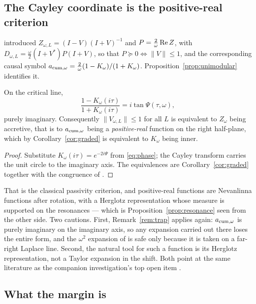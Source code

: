 \subsection{The Cayley coordinate is the positive-real criterion}

\cite{CumulativePath} introduced $Z_{\omega,L}=(I-V)(I+V)^{-1}$ and
$P=\frac2\omega\operatorname{Re} Z$, with $D_{\omega,L}=\frac\omega2(I+V^*)P(I+V)$, so that
$P\succeq0\iff\lVert V\rVert\leq1$, and the corresponding causal symbol
$a_{\rm cum,\omega}=\frac2\omega(1-K_\omega)/(1+K_\omega)$.
Proposition~\ref{prop:unimodular} identifies it.

\begin{proposition}[Reactance]\label{prop:cayley}
On the critical line,
\[
 \frac{1-K_\omega(i\tau)}{1+K_\omega(i\tau)}=i\tan\Psi(\tau,\omega),
\]
purely imaginary. Consequently $\lVert V_{\omega,L}\rVert\leq1$ for all $L$ is
equivalent to $Z_\omega$ being accretive, that is to $a_{\rm cum,\omega}$ being a
\emph{positive-real} function on the right half-plane, which by
Corollary~\ref{cor:graded} is equivalent to $K_\omega$ being inner.
\end{proposition}

\begin{proof}
Substitute $K_\omega(i\tau)=e^{-2i\Psi}$ from \eqref{eq:phase}; the Cayley
transform carries the unit circle to the imaginary axis. The equivalences are
Corollary~\ref{cor:graded} together with the congruence of
\cite{CumulativePath}.
\end{proof}

That is the classical passivity criterion, and positive-real functions are
Nevanlinna functions after rotation, with a Herglotz representation whose measure
is supported on the resonances --- which is Proposition~\ref{prop:resonance} seen
from the other side. Two cautions. First, Remark~\ref{rem:trap} applies again:
$a_{\rm cum,\omega}$ is purely imaginary on the imaginary axis, so any expansion
carried out there loses the entire form, and the $\omega^2$ expansion of
\cite{CumulativePath} is safe only because it is taken on a far-right Laplace
line. Second, the natural tool for such a function is its Herglotz
representation, not a Taylor expansion in the shift. Both point at the same
literature as the companion investigation's top open item \cite{SuzukiDeBranges}.

\subsection{What the margin is}

